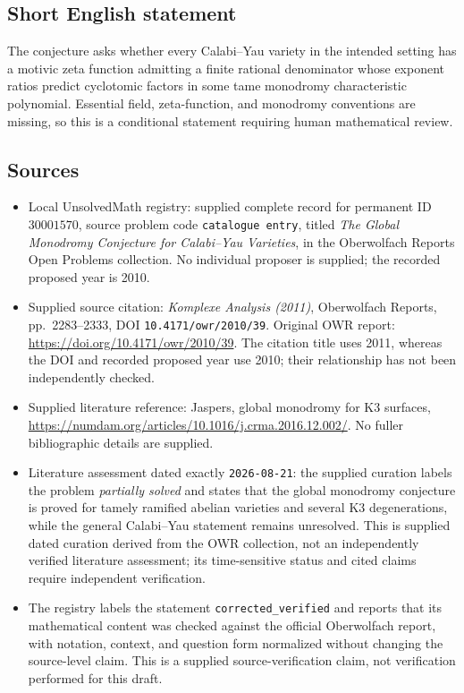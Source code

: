 \documentclass[11pt]{article}
\begin{document}
\subsection{Short English statement}
The conjecture asks whether every Calabi--Yau variety in the intended setting has a motivic zeta function admitting a finite rational denominator whose exponent ratios predict cyclotomic factors in some tame monodromy characteristic polynomial. Essential field, zeta-function, and monodromy conventions are missing, so this is a conditional statement requiring human mathematical review.
\subsection{Sources}
\begin{itemize}
\item Local UnsolvedMath registry: supplied complete record for permanent ID \(30001570\), source problem code \texttt{catalogue entry}, titled \emph{The Global Monodromy Conjecture for Calabi--Yau Varieties}, in the Oberwolfach Reports Open Problems collection. No individual proposer is supplied; the recorded proposed year is 2010.
\item Supplied source citation: \emph{Komplexe Analysis (2011)}, Oberwolfach Reports, pp.\ 2283--2333, DOI \texttt{10.4171/owr/2010/39}. Original OWR report: \url{https://doi.org/10.4171/owr/2010/39}. The citation title uses 2011, whereas the DOI and recorded proposed year use 2010; their relationship has not been independently checked.
\item Supplied literature reference: Jaspers, global monodromy for K3 surfaces, \url{https://numdam.org/articles/10.1016/j.crma.2016.12.002/}. No fuller bibliographic details are supplied.
\item Literature assessment dated exactly \texttt{2026-08-21}: the supplied curation labels the problem \emph{partially solved} and states that the global monodromy conjecture is proved for tamely ramified abelian varieties and several K3 degenerations, while the general Calabi--Yau statement remains unresolved. This is supplied dated curation derived from the OWR collection, not an independently verified literature assessment; its time-sensitive status and cited claims require independent verification.
\item The registry labels the statement \texttt{corrected\_verified} and reports that its mathematical content was checked against the official Oberwolfach report, with notation, context, and question form normalized without changing the source-level claim. This is a supplied source-verification claim, not verification performed for this draft.
\end{itemize}
\end{document}
